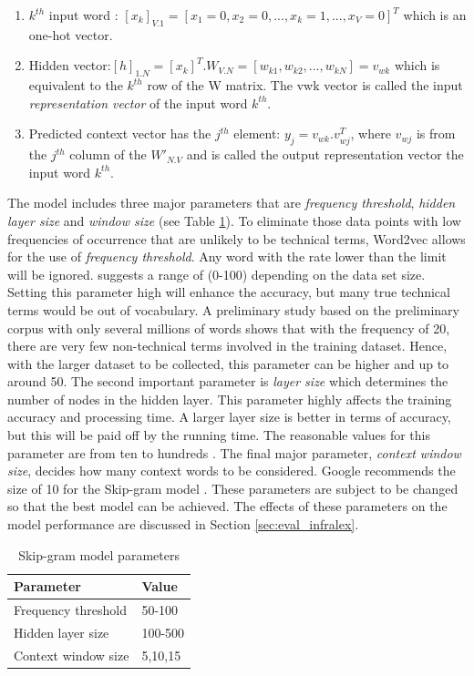 \documentclass[Journal,InsideFigs, DoubleSpace]{ascelike} %
\begin{document}
%
\begin{enumerate}
	\item $k^{th}$ input word : $[x_k]_{V.1} = [x_1=0, x_2=0,...,x_k=1,..., x_V=0]^T$ which is an one-hot vector.
	\item Hidden vector:$[h]_{1.N} = [x_k]^T.W_{V.N} = [w_{k1},w_{k2},..., w_{kN}]= v_{wk}$ which is equivalent to the $k^{th}$ row of the W matrix. The vwk vector is called the  input \textit{representation vector} of the input word $k^{th}$.
	\item Predicted context vector has the $j^{th}$ element: $y_j = v_{wk}.v^T_{wj}$, where $v_{wj}$ is from the $j^{th}$ column of the $W'_{N.V}$ and is called the output representation vector the input word $k^{th}$. 
\end{enumerate}
%
\par
The model includes three major parameters that are \textit{frequency threshold}, \textit{hidden layer size} and \textit{window size} (see Table \ref{table:nn-parameters}). To eliminate those data points with low frequencies of occurrence that are unlikely to be technical terms, Word2vec allows for the use of \textit{frequency threshold}. Any word with the rate lower than the limit will be ignored.  suggests a range of (0-100) depending on the data set size. Setting this parameter high will enhance the accuracy, but many true technical terms would be out of vocabulary. A preliminary study based on the preliminary corpus with only several millions of words shows that with the frequency of 20, there are very few non-technical terms involved in the training dataset. Hence, with the larger dataset to be collected, this parameter can be higher and up to around 50. The second important parameter is \textit{layer size} which determines the number of nodes in the hidden layer. This parameter highly affects the training accuracy and processing time. A larger layer size is better in terms of accuracy, but this will be paid off by the running time. The reasonable values for this parameter are from ten to hundreds \cite{rehurek14}. The final major parameter, \textit{context window size}, decides how many context words to be considered. Google recommends the size of 10 for the Skip-gram model \cite{google2016}. These parameters are subject to be changed so that the best model can be achieved. The effects of these parameters on the model performance are discussed in Section \ref{sec:eval_infralex}.
%
\begin{table} [t]
	\caption{Skip-gram model parameters}
	\label{table:nn-parameters}
	\centering
	\small
	\renewcommand{\arraystretch}{1.25}
	\begin{tabular}{l l}
		\hline
		\textbf{Parameter} & \textbf{Value}\\
		\hline
		Frequency threshold & 50-100\\
		Hidden layer size		&	100-500\\
		Context window size	&	5,10,15\\
		\hline
	\end{tabular}
	\normalsize
\end{table}
\end{document}
